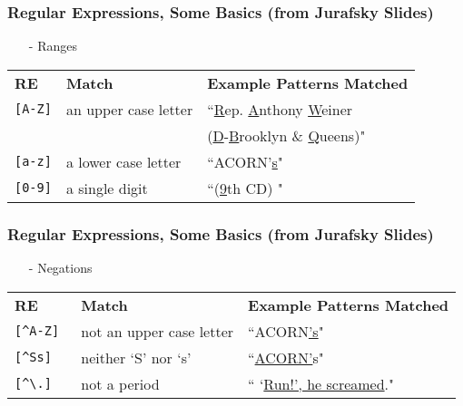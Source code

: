 \documentclass{beamer}
\numberwithin{equation}{section}
\begin{document}
\begin{frame} 
\frametitle{Regular Expressions, Some Basics (from Jurafsky Slides) } 
\begin{itemize}
\item[-] Ranges 
\end{itemize}
\begin{center}
\begin{tabular} {lll} 
\textbf{RE} & \textbf{Match} & \textbf{Example Patterns Matched}\\
{\tt [A-Z]}  & an upper case letter   & ``\underline{R}ep. \underline{A}nthony \underline{W}einer\\
  &    &   (\underline{D}-\underline{B}rooklyn \& \underline{Q}ueens)" \\
{\tt [a-z]}  & a lower case letter &   ``ACORN'\underline{s}" \\
{\tt [0-9]}  & a single digit  & ``(\underline{9}th CD) " 
\end{tabular}
\end{center}
\end{frame}



\begin{frame}
\frametitle{Regular Expressions, Some Basics (from Jurafsky Slides) } 
\begin{itemize}
\item[-] Negations 
\end{itemize}
\begin{center}
\begin{tabular}{lll}
\textbf{RE} & \textbf{Match} & \textbf{Example Patterns Matched}\\
{\tt [\^{}A-Z] } & not an upper case letter &  ``ACORN\alert{\underline{'}\underline{s}}" \\
{\tt[\^{}Ss] } & neither `S' nor `s' & ``\alert{\underline{ACORN'}}s" \\
{\tt[\^{}\textbackslash.] } & not a period & `` `\underline{Run!', he screamed}." \\
\end{tabular}
\end{center}
\end{frame}
\end{document}
